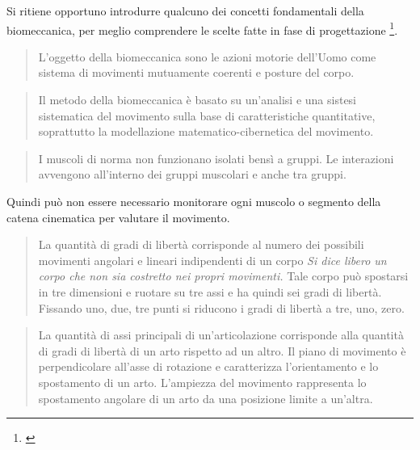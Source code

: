 Si ritiene opportuno introdurre qualcuno dei concetti fondamentali della biomeccanica,
per meglio comprendere le scelte fatte in fase di progettazione
\footnote{\cite{biomec_ted}}.

\begin{quote}
 {L'oggetto} della biomeccanica sono le azioni motorie dell'Uomo come sistema
di movimenti mutuamente coerenti e posture del corpo.
\end{quote}

\begin{quote}
 {Il metodo} della biomeccanica \`e basato su un'analisi e una sistesi sistematica
del movimento sulla base di caratteristiche quantitative,
soprattutto la modellazione matematico-cibernetica del movimento.
\end{quote}


\begin{quote}
I muscoli di norma non funzionano isolati bens\`i a gruppi.
Le interazioni avvengono all'interno dei gruppi muscolari e anche tra gruppi.
\end{quote}
Quindi può non essere necessario monitorare ogni muscolo
o segmento della catena cinematica per valutare il movimento.

\begin{quote}
La quantit\`a di gradi di libert\`a corrisponde al numero dei possibili movimenti
angolari e lineari indipendenti di un corpo
\textit {Si dice \emph {libero} un corpo che non sia costretto nei propri movimenti.}
Tale corpo pu\`o spostarsi in tre dimensioni e ruotare su tre assi
e ha quindi sei gradi di libert\`a.
Fissando uno, due, tre punti si riducono i gradi di libert\`a a tre, uno, zero.
\end{quote}


\begin{quote}
La quantit\`a di assi principali di un'articolazione corrisponde
alla quantit\`a di gradi di libert\`a di un arto rispetto ad un altro.
Il piano di movimento \`e perpendicolare all'asse di rotazione
e caratterizza l'orientamento e lo spostamento di un arto.
L'ampiezza del movimento rappresenta lo spostamento angolare
di un arto da una posizione limite a un'altra.
\end{quote}